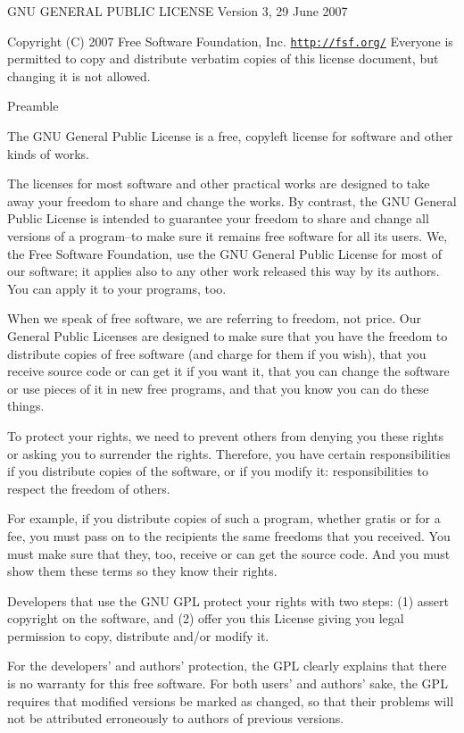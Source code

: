 G\+N\+U G\+E\+N\+E\+R\+A\+L P\+U\+B\+L\+I\+C L\+I\+C\+E\+N\+S\+E Version 3, 29 June 2007

Copyright (C) 2007 Free Software Foundation, Inc. \href{http://fsf.org/}{\tt http\+://fsf.\+org/} Everyone is permitted to copy and distribute verbatim copies of this license document, but changing it is not allowed. \begin{DoxyVerb}                       Preamble
\end{DoxyVerb}


The G\+N\+U General Public License is a free, copyleft license for software and other kinds of works.

The licenses for most software and other practical works are designed to take away your freedom to share and change the works. By contrast, the G\+N\+U General Public License is intended to guarantee your freedom to share and change all versions of a program--to make sure it remains free software for all its users. We, the Free Software Foundation, use the G\+N\+U General Public License for most of our software; it applies also to any other work released this way by its authors. You can apply it to your programs, too.

When we speak of free software, we are referring to freedom, not price. Our General Public Licenses are designed to make sure that you have the freedom to distribute copies of free software (and charge for them if you wish), that you receive source code or can get it if you want it, that you can change the software or use pieces of it in new free programs, and that you know you can do these things.

To protect your rights, we need to prevent others from denying you these rights or asking you to surrender the rights. Therefore, you have certain responsibilities if you distribute copies of the software, or if you modify it\+: responsibilities to respect the freedom of others.

For example, if you distribute copies of such a program, whether gratis or for a fee, you must pass on to the recipients the same freedoms that you received. You must make sure that they, too, receive or can get the source code. And you must show them these terms so they know their rights.

Developers that use the G\+N\+U G\+P\+L protect your rights with two steps\+: (1) assert copyright on the software, and (2) offer you this License giving you legal permission to copy, distribute and/or modify it.

For the developers' and authors' protection, the G\+P\+L clearly explains that there is no warranty for this free software. For both users' and authors' sake, the G\+P\+L requires that modified versions be marked as changed, so that their problems will not be attributed erroneously to authors of previous versions.

